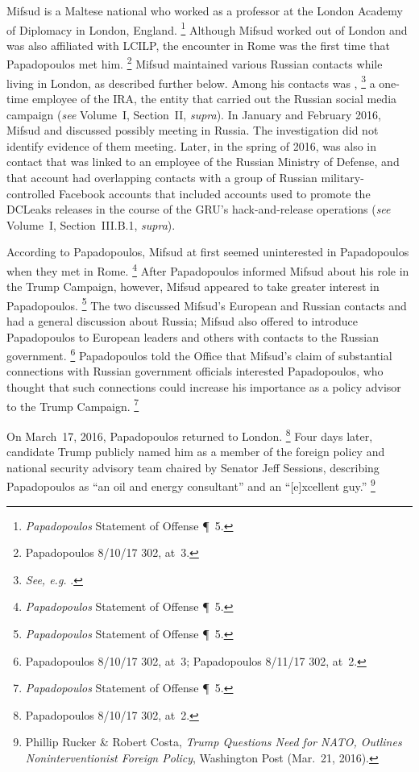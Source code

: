 Mifsud is a Maltese national who worked as a professor at the London Academy of Diplomacy in London, England.%
\footnote{\textit{Papadopoulos} Statement of Offense \P~5.}
Although Mifsud worked out of London and was also affiliated with LCILP, the encounter in Rome was the first time that Papadopoulos met him.%
\footnote{Papadopoulos 8/10/17 302, at~3.}
Mifsud maintained various Russian contacts while living in London, as described further below.
Among his contacts was ,%
\footnote{\textit{See, e.g.} .
}
a one-time employee of the IRA, the entity that carried out the Russian social media campaign (\textit{see} Volume~I, Section~II, \textit{supra}).
In January and February 2016, Mifsud and  discussed  possibly meeting in Russia.
The investigation did not identify evidence of them meeting.
Later, in the spring of 2016,  was also in contact  that was linked to an employee of the Russian Ministry of Defense, and that account had overlapping contacts with a group of Russian military-controlled Facebook accounts that included accounts used to promote the DCLeaks releases in the course of the GRU's hack-and-release operations (\textit{see} Volume~I, Section~III.B.1, \textit{supra}).

According to Papadopoulos, Mifsud at first seemed uninterested in Papadopoulos when they met in Rome.%
\footnote{\textit{Papadopoulos} Statement of Offense \P~5.}
After Papadopoulos informed Mifsud about his role in the Trump Campaign, however, Mifsud appeared to take greater interest in Papadopoulos.%
\footnote{\textit{Papadopoulos} Statement of Offense \P~5.}
The two discussed Mifsud's European and Russian contacts and had a general discussion about Russia; Mifsud also offered to introduce Papadopoulos to European leaders and others with contacts to the Russian government.%
\footnote{Papadopoulos 8/10/17 302, at~3; Papadopoulos 8/11/17 302, at~2.}
Papadopoulos told the Office that Mifsud's claim of substantial connections with Russian government officials interested Papadopoulos, who thought that such connections could increase his importance as a policy advisor to the Trump Campaign.%
\footnote{\textit{Papadopoulos} Statement of Offense \P~5.}

On March~17, 2016, Papadopoulos returned to London.%
\footnote{Papadopoulos 8/10/17 302, at~2.}
Four days later, candidate Trump publicly named him as a member of the foreign policy and national security advisory team chaired by Senator Jeff Sessions, describing Papadopoulos as ``an oil and energy consultant'' and an ``[e]xcellent guy.''%
\footnote{Phillip Rucker \& Robert Costa, \textit{Trump Questions Need for NATO, Outlines Noninterventionist Foreign Policy}, Washington Post (Mar.~21, 2016).}

